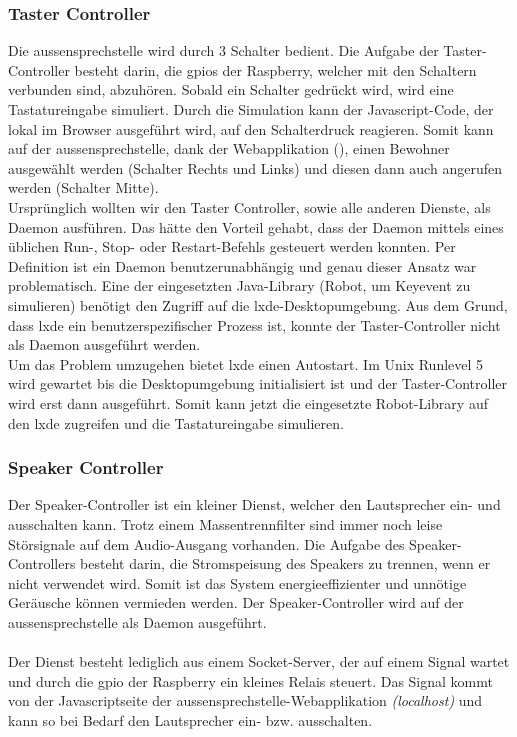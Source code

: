 \subsubsection{Taster Controller}
Die \gls{aussensprechstelle} wird durch 3 Schalter bedient. Die Aufgabe der Taster-Controller besteht darin, die \gls{gpio}s der Raspberry, welcher mit den Schaltern verbunden sind, abzuhören. Sobald ein Schalter gedrückt wird, wird eine Tastatureingabe simuliert. Durch die Simulation kann der Javascript-Code, der lokal im Browser ausgeführt wird, auf den Schalterdruck reagieren. Somit kann auf der \gls{aussensprechstelle}, dank der Webapplikation (), einen Bewohner ausgewählt werden (Schalter Rechts und Links) und diesen dann auch angerufen werden (Schalter Mitte).
\\
Ursprünglich wollten wir den Taster Controller, sowie alle anderen Dienste, als Daemon ausführen. Das hätte den Vorteil gehabt, dass der Daemon mittels eines üblichen Run-, Stop- oder Restart-Befehls gesteuert werden konnten. Per Definition ist ein Daemon benutzerunabhängig und genau dieser Ansatz war problematisch. Eine der eingesetzten Java-Library (Robot, um Keyevent zu simulieren) benötigt den Zugriff auf die \gls{lxde}-Desktopumgebung. Aus dem Grund, dass \gls{lxde} ein benutzerspezifischer Prozess ist, konnte der Taster-Controller nicht als Daemon ausgeführt werden.
\\
Um das Problem umzugehen bietet \gls{lxde} einen Autostart. Im Unix Runlevel 5 wird gewartet bis die Desktopumgebung initialisiert ist und der Taster-Controller wird erst dann ausgeführt. Somit kann jetzt die eingesetzte Robot-Library auf den \gls{lxde} zugreifen und die Tastatureingabe simulieren.
\\

\subsubsection{Speaker Controller}
Der Speaker-Controller ist ein kleiner Dienst, welcher den Lautsprecher ein- und ausschalten kann. Trotz einem Massentrennfilter sind immer noch leise Störsignale auf dem Audio-Ausgang vorhanden. Die Aufgabe des Speaker-Controllers besteht darin, die Stromspeisung des Speakers zu trennen, wenn er nicht verwendet wird. Somit ist das System energieeffizienter und unnötige Geräusche können vermieden werden. Der Speaker-Controller wird auf der \gls{aussensprechstelle} als Daemon ausgeführt.
\\
\\
Der Dienst besteht lediglich aus einem Socket-Server, der auf einem Signal wartet und durch die \gls{gpio} der Raspberry ein kleines Relais steuert. Das Signal kommt von der Javascriptseite der \gls{aussensprechstelle}-Webapplikation \textit{(localhost)} und kann so bei Bedarf den Lautsprecher ein- bzw. ausschalten.
\\

